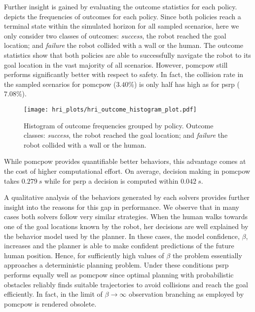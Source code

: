 Further insight is gained by evaluating the outcome statistics for each policy.
 depicts the frequencies of outcomes for each
policy. Since both policies reach a terminal state within the simulated horizon
for all sampled scenarios, here we only consider two classes of outcomes:
\emph{success}, the robot reached the goal location; and \emph{failure} the
robot collided with a wall or the human. The outcome statistics show that both
policies are able to successfully navigate the robot to its goal location in
the vast majority of all scenarios. However, \ac{pomcpow} still performs
significantly better with respect to safety. In fact, the collision rate in the
sampled scenarios for \ac{pomcpow} ($3.40\%$) is only half has high as for
\ac{psrp} ($7.08\%$).

\begin{figure}[H]
  \centering
  \texttt{[image: hri\_plots/hri\_outcome\_histogram\_plot.pdf]}
  \caption{Histogram of outcome frequencies grouped by policy. Outcome classes:
  \emph{success}, the robot reached the goal location; and \emph{failure} the
  robot collided with a wall or the human.}
  \label{fig:hri_outcome_histogram}
\end{figure}

While \ac{pomcpow} provides quantifiable better behaviors, this advantage comes
at the cost of higher computational effort. On average, decision making in
\ac{pomcpow} takes $\SI{0.279}{s}$ while for \ac{psrp} a decision is computed
within $\SI{0.042}{s}$.

A qualitative analysis of the behaviors generated by each solvers provides
further insight into the reasons for this gap in performance. We observe that
in many cases both solvers follow very similar strategies. When the human walks
towards one of the goal locations known by the robot, her decisions are well
explained by the behavior model used by the planner. In these cases, the model
confidence, $\beta$, increases and the planner is able to make confident
predictions of the future human position. Hence, for sufficiently high values
of $\beta$ the problem essentially approaches a deterministic planning problem.
Under these conditions \ac{psrp} performs equally well as \ac{pomcpow} since
optimal planning with probabilistic obstacles reliably finds suitable
trajectories to avoid collisions and reach the goal efficiently. In fact, in
the limit of $\beta \to \infty$ observation branching as employed by
\ac{pomcpow} is rendered obsolete.

